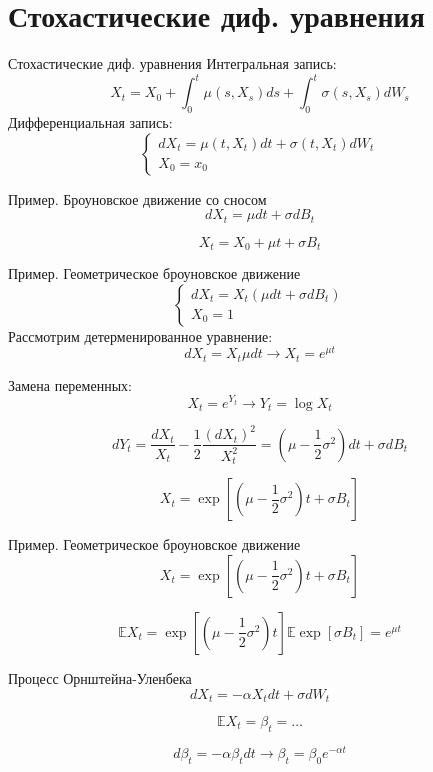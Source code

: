 \documentclass{beamer}
\begin{document}
\section{Стохастические диф. уравнения}
\begin{frame}{Стохастические диф. уравнения}
    Интегральная запись:
    $$
        X_t = X_0 + \int_0^t \mu(s, X_s) ds + \int_0^t \sigma(s, X_s) dW_s
    $$
    Дифференциальная запись:
    $$
    \begin{cases}
        d X_t = \mu(t, X_t) dt + \sigma(t, X_t) dW_t \\
        X_0 = x_0
    \end{cases}
    $$
\end{frame}

\begin{frame}{Пример. Броуновское движение со сносом}
    $$
        dX_t = \mu dt + \sigma dB_t 
    $$
     
    $$
        X_t = X_0 + \mu t + \sigma B_t
    $$
\end{frame}

\begin{frame}{Пример. Геометрическое броуновское движение}
    $$\begin{cases}
            dX_t = X_t \left( \mu dt + \sigma dB_t \right) \\
            X_0 = 1
    \end{cases}$$
      Рассмотрим детерменированное уравнение:
    $$
        dX_t = X_t \mu dt \to X_t = e^{\mu t}
    $$
     
    Замена переменных:
    $$X_t = e^{Y_t} \longrightarrow  Y_t = \log X_t$$
      
    $$d Y_t = \dfrac{d X_t}{X_t} - \dfrac{1}{2} \dfrac{(dX_t)^2}{X_t^2} =\left( \mu - \dfrac{1}{2}\sigma^2 \right) dt + \sigma dB_t$$
     
    $$X_t = \exp\left[ \left( \mu - \dfrac{1}{2}\sigma^2 \right) t + \sigma B_t \right]$$
\end{frame}

\begin{frame}{Пример. Геометрическое броуновское движение}
    $$X_t = \exp\left[ \left( \mu - \dfrac{1}{2}\sigma^2 \right) t + \sigma B_t \right]$$
    
    $$
        \mathbb{E} X_t =   \exp \left[ \left( \mu - \dfrac{1}{2}\sigma^2 \right) t \right] \mathbb{E} \exp \left[
            \sigma B_t
        \right] =   e^{\mu t}
    $$
\end{frame}

\begin{frame}{Процесс Орнштейна-Уленбека}
    $$
        d X_t = -\alpha X_t dt + \sigma dW_t
    $$
      
    $$
        \mathbb{E} X_t = \beta_t = \ldots
    $$
      
    $$
        d \beta_t = -\alpha \beta_t dt \longrightarrow    \beta_t = \beta_0 e^{-\alpha t}  
    $$
\end{frame}
\end{document}
